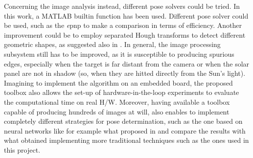 Concerning the image analysis instead, different pose solvers could be tried. In this work, a MATLAB builtin function has been used. Different pose solver could be used, such as the \textit{e}\acrshort{pnp} \cite{10.1007/s11263-008-0152-6} to make a comparison in terms of efficiency. Another improvement could be to employ separated Hough transforms to detect different geometric shapes, as suggested also in \cite{Sharma2018}. In general, the image processing subsystem still has to be improved, as it is susceptible to producing spurious edges, especially when the target is far distant from the camera or when the solar panel are not in shadow (so, when they are hitted directly from the Sun's light).
Imagining to implement the algorithm on an embedded board, the proposed toolbox also allows the set-up of hardware-in-the-loop experiments to evaluate the computational time on real H/W.
Moreover, having available a toolbox capable of producing hundreds of images at will, also enables to implement completely different strategies for pose determination, such as the one based on neural networks like for example what proposed in \cite{Sharma2019} and compare the results with what obtained implementing more traditional techniques such as the ones used in this project.